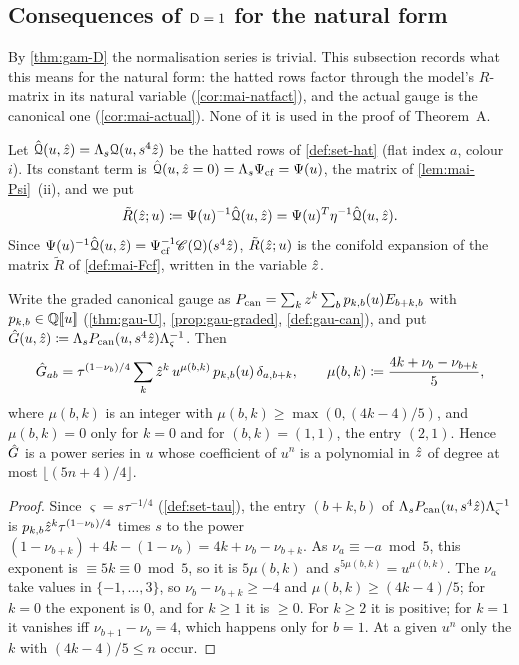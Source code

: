 \subsection{Consequences of \texorpdfstring{$\mathsf{D}=1$}{D=1} for the natural form}
\label{sec:mai-nat}

By \cref{thm:gam-D} the normalisation series is trivial. This subsection records what this means for the natural form: the hatted rows factor through the model's $R$-matrix in its natural variable (\cref{cor:mai-natfact}), and the actual gauge is the canonical one (\cref{cor:mai-actual}). None of it is used in the proof of Theorem~A.

Let $\hat{\mathcal{Q}}(u,\hat{z})=\Lambda_s\mathcal{Q}(u,s^4\hat{z})$ be the hatted rows of \cref{def:set-hat} (flat index $a$, colour $i$). Its constant term is $\hat{\mathcal{Q}}(u,\hat{z}=0)=\Lambda_s\Psi_{\mathrm{cf}}=\Psi(u)$, the matrix of \cref{lem:mai-Psi}~(ii), and we put
\[
\tilde R(\hat{z};u)\coloneqq\Psi(u)^{-1}\hat{\mathcal{Q}}(u,\hat{z})=\Psi(u)^T\eta^{-1}\hat{\mathcal{Q}}(u,\hat{z}).
\]
Since $\Psi(u)^{-1}\hat{\mathcal{Q}}(u,\hat{z})=\Psi_{\mathrm{cf}}^{-1}\mathscr{C}(\mathcal{Q})(s^4\hat{z})$, $\tilde R(\hat{z};u)$ is the conifold expansion of the matrix $\tilde R$ of \cref{def:mai-Fcf}, written in the variable $\hat{z}$.

\begin{lem}
\label{lem:mai-Ghat}
Write the graded canonical gauge as $P_{\mathrm{can}}=\sum_kz^k\sum_bp_{k,b}(u)E_{b+k,b}$ with $p_{k,b}\in\mathbb{Q}[\![ u ]\!]$ (\cref{thm:gau-U}, \cref{prop:gau-graded}, \cref{def:gau-can}), and put $\hat{G}(u,\hat{z})\coloneqq\Lambda_sP_{\mathrm{can}}(u,s^4\hat{z})\Lambda_\varsigma^{-1}$. Then
\[
\hat{G}_{ab}=\tau^{(1-\nu_b)/4}\sum_k\hat{z}^k\,u^{\mu(b,k)}\,p_{k,b}(u)\,\delta_{a,b+k},\qquad\mu(b,k)\coloneqq\frac{4k+\nu_b-\nu_{b+k}}{5},
\]
where $\mu(b,k)$ is an integer with $\mu(b,k)\geq\max(0,(4k-4)/5)$, and $\mu(b,k)=0$ only for $k=0$ and for $(b,k)=(1,1)$, the entry $(2,1)$. Hence $\hat{G}$ is a power series in $u$ whose coefficient of $u^n$ is a polynomial in $\hat{z}$ of degree at most $\lfloor(5n+4)/4\rfloor$.
\end{lem}

\begin{proof}
Since $\varsigma=s\tau^{-1/4}$ (\cref{def:set-tau}), the entry $(b+k,b)$ of $\Lambda_sP_{\mathrm{can}}(u,s^4\hat{z})\Lambda_\varsigma^{-1}$ is $p_{k,b}\hat{z}^k\tau^{(1-\nu_b)/4}$ times $s$ to the power $(1-\nu_{b+k})+4k-(1-\nu_b)=4k+\nu_b-\nu_{b+k}$. As $\nu_a\equiv-a\bmod5$, this exponent is $\equiv5k\equiv0\bmod5$, so it is $5\mu(b,k)$ and $s^{5\mu(b,k)}=u^{\mu(b,k)}$. The $\nu_a$ take values in $\{-1,\dots,3\}$, so $\nu_b-\nu_{b+k}\geq-4$ and $\mu(b,k)\geq(4k-4)/5$; for $k=0$ the exponent is $0$, and for $k\geq1$ it is $\geq0$. For $k\geq2$ it is positive; for $k=1$ it vanishes iff $\nu_{b+1}-\nu_b=4$, which happens only for $b=1$. At a given $u^n$ only the $k$ with $(4k-4)/5\leq n$ occur.
\end{proof}

